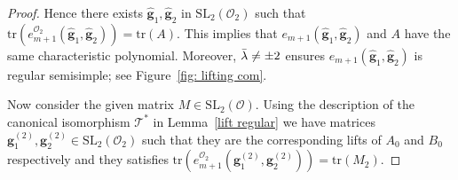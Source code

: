 \documentclass[10pt,twoside]{amsart}
\newcommand{\GL}{\mathrm{GL}}
\newcommand{\SL}{\mathrm{SL}}
\newcommand{\tr}{\mathrm{tr}}
\newcommand{\M}{\mathrm{M}}
\newcommand{\R}{\mathcal{O}_2}
\theoremstyle{definition}
\theoremstyle{definition}
\begin{document}
\begin{proof}

Hence there exists $\widehat{\mathbf{g}}_1, \widehat{\mathbf{g}}_2$ in $\SL_2(\R)$ such that  $\tr(e_{m+1}^{\R}(\widehat{\mathbf{g}}_1, \widehat{\mathbf{g}}_2)) = \tr(A)$. This implies that $e_{m+1}(\widehat{\mathbf{g}}_1, \widehat{\mathbf{g}}_2)$ and $A$ have the same characteristic polynomial. Moreover,  $\Bar{\lambda} \neq \pm2$ ensures $e_{m+1}(\widehat{\mathbf{g}}_1, \widehat{\mathbf{g}}_2)$ is regular semisimple; see Figure~\ref{fig: lifting com}. 

Now consider the given matrix $M\in \SL_2(\mathcal{O})$.   
Using the description of the canonical isomorphism $\mathcal{T}^*$ in Lemma~\ref{lift regular} we have matrices $\mathbf{g}_1^{(2)}, \mathbf{g}_2^{(2)}\in \SL_2(\mathcal{O}_2)$ such that they are the corresponding lifts of $A_0$ and $B_0$ respectively and they satisfies $\tr(e_{m+1}^{\R}(\mathbf{g}_1^{(2)}, \mathbf{g}_2^{(2)})) = \tr(M_2)$. 


\end{proof}
\end{document}

